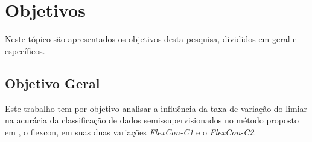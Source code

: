 \section{Objetivos}
    \label{sec:objetivos}

    Neste tópico são apresentados os objetivos desta pesquisa, divididos em geral e específicos.

    \subsection{Objetivo Geral}
        \label{subsec:objetivo-geral}





        Este trabalho tem por objetivo analisar a influência da taxa de variação do limiar na acurácia da classificação de dados semissupervisionados no método proposto em \citeauthor{vale2018selftraining}, o \ac{flexcon}, em suas duas variações \textit{FlexCon\hyp{C1}} e o \textit{FlexCon\hyp{C2}}.

